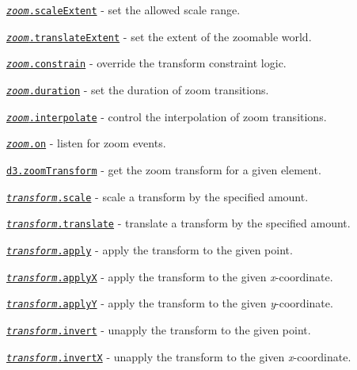 \begin{DoxyItemize}
\item \href{https://github.com/d3/d3-zoom/blob/master/README.md#zoom_scaleExtent}{\tt {\itshape zoom}.scale\+Extent} -\/ set the allowed scale range.
\item \href{https://github.com/d3/d3-zoom/blob/master/README.md#zoom_translateExtent}{\tt {\itshape zoom}.translate\+Extent} -\/ set the extent of the zoomable world.
\item \href{https://github.com/d3/d3-zoom/blob/master/README.md#zoom_constrain}{\tt {\itshape zoom}.constrain} -\/ override the transform constraint logic.
\item \href{https://github.com/d3/d3-zoom/blob/master/README.md#zoom_duration}{\tt {\itshape zoom}.duration} -\/ set the duration of zoom transitions.
\item \href{https://github.com/d3/d3-zoom/blob/master/README.md#zoom_interpolate}{\tt {\itshape zoom}.interpolate} -\/ control the interpolation of zoom transitions.
\item \href{https://github.com/d3/d3-zoom/blob/master/README.md#zoom_on}{\tt {\itshape zoom}.on} -\/ listen for zoom events.
\item \href{https://github.com/d3/d3-zoom/blob/master/README.md#zoomTransform}{\tt d3.\+zoom\+Transform} -\/ get the zoom transform for a given element.
\item \href{https://github.com/d3/d3-zoom/blob/master/README.md#transform_scale}{\tt {\itshape transform}.scale} -\/ scale a transform by the specified amount.
\item \href{https://github.com/d3/d3-zoom/blob/master/README.md#transform_translate}{\tt {\itshape transform}.translate} -\/ translate a transform by the specified amount.
\item \href{https://github.com/d3/d3-zoom/blob/master/README.md#transform_apply}{\tt {\itshape transform}.apply} -\/ apply the transform to the given point.
\item \href{https://github.com/d3/d3-zoom/blob/master/README.md#transform_applyX}{\tt {\itshape transform}.applyX} -\/ apply the transform to the given {\itshape x}-\/coordinate.
\item \href{https://github.com/d3/d3-zoom/blob/master/README.md#transform_applyY}{\tt {\itshape transform}.applyY} -\/ apply the transform to the given {\itshape y}-\/coordinate.
\item \href{https://github.com/d3/d3-zoom/blob/master/README.md#transform_invert}{\tt {\itshape transform}.invert} -\/ unapply the transform to the given point.
\item \href{https://github.com/d3/d3-zoom/blob/master/README.md#transform_invertX}{\tt {\itshape transform}.invertX} -\/ unapply the transform to the given {\itshape x}-\/coordinate.

\end{DoxyItemize}
